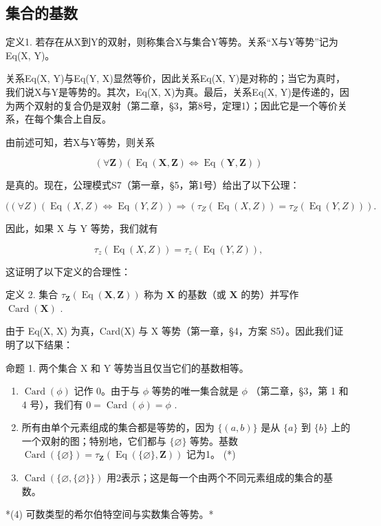 \subsection{集合的基数}

定义1. 若存在从X到Y的双射，则称集合X与集合Y等势。关系“X与Y等势”记为Eq(X, Y)。

关系Eq(X, Y)与Eq(Y, X)显然等价，因此关系Eq(X, Y)是对称的；当它为真时，我们说X与Y是等势的。其次，Eq(X, X)为真。最后，关系Eq(X, Y)是传递的，因为两个双射的复合仍是双射（第二章，§3，第8号，定理1）；因此它是一个等价关系，在每个集合上自反。

由前述可知，若X与Y等势，则关系

\[
(\forall \mathbf {Z}) (\operatorname{Eq} (\mathbf {X}, \mathbf {Z}) \Longleftrightarrow \operatorname{Eq} (\mathbf {Y}, \mathbf {Z}))
\]

是真的。现在，公理模式S7（第一章，§5，第1号）给出了以下公理：

\[
((\forall Z) (\operatorname{Eq} (X, Z) \Longleftrightarrow \operatorname{Eq} (Y, Z)) \Longrightarrow (\tau_ {Z} (\operatorname{Eq} (X, Z)) = \tau_ {Z} (\operatorname{Eq} (Y, Z))).
\]

因此，如果 X 与 Y 等势，我们就有

\[
\tau_ {z} (\operatorname{Eq} (X, Z)) = \tau_ {z} (\operatorname{Eq} (Y, Z)),
\]

这证明了以下定义的合理性：

定义 2. 集合 \(\tau_{\mathbf{Z}}(\operatorname{Eq}(\mathbf{X},\mathbf{Z}))\) 称为 \(\mathbf{X}\) 的基数（或 \(\mathbf{X}\) 的势）并写作 \(\operatorname{Card}(\mathbf{X})\) .

由于 Eq(X, X) 为真，Card(X) 与 X 等势（第一章，§4，方案 S5）。因此我们证明了以下结果：

命题 1. 两个集合 X 和 Y 等势当且仅当它们的基数相等。


\begin{enumerate}
\def\labelenumi{(\arabic{enumi})}
\item
  \(\operatorname{Card}(\phi)\) 记作 0。由于与 \(\phi\) 等势的唯一集合就是 \(\phi\) （第二章，§3，第 1 和 4 号），我们有 \(0 = \operatorname{Card}(\phi) = \phi\) .
\item
  所有由单个元素组成的集合都是等势的，因为 \(\{(a, b)\}\) 是从 \(\{a\}\) 到 \(\{b\}\) 上的一个双射的图；特别地，它们都与 \(\{\varnothing\}\) 等势。基数 \(\operatorname{Card}(\{\varnothing\}) = \tau_{\mathbf{Z}}(\operatorname{Eq}(\{\varnothing\}, \mathbf{Z}))\) 记为1。 (*)
\item
  \(\operatorname{Card}(\{\varnothing, \{\varnothing\}\})\) 用2表示；这是每一个由两个不同元素组成的集合的基数。
\end{enumerate}

*(4) 可数类型的希尔伯特空间与实数集合等势。*

